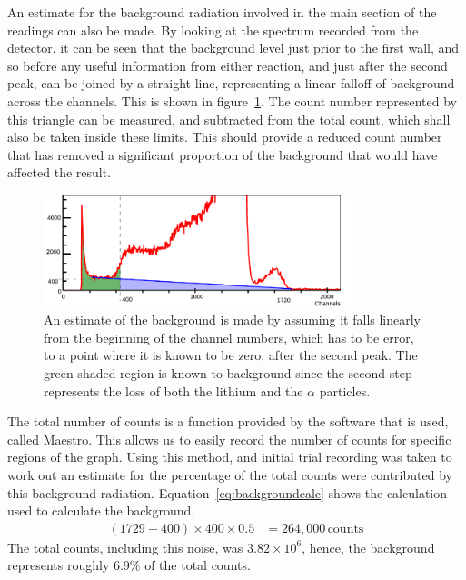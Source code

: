 An estimate for the background radiation involved in the main section of the readings can also be made. By looking at the spectrum recorded from the detector, it can be seen that the background level just prior to the first wall, and so before any useful information from either reaction, and just after the second peak, can be joined by a straight line, representing a linear falloff of background across the channels. This is shown in figure~\ref{fig:bf3errorest}. The count number represented by this triangle can be measured, and subtracted from the total count, which shall also be taken inside these limits. This should provide a reduced count number that has removed a significant proportion of the background that would have affected the result.
\begin{figure}[ht]
  \centering
  \includegraphics[width=0.8\textwidth]{BF3background.pdf}
  \caption{An estimate of the background is made by assuming it falls linearly from the beginning of the channel numbers, which has to be error, to a point where it is known to be zero, after the second peak. The green shaded region is known to background since the second step represents the loss of both the lithium and the $\alpha$ particles. \label{fig:bf3errorest}}
\end{figure}

The total number of counts is a function provided by the software that is used, called Maestro. This allows us to easily record the number of counts for specific regions of the graph. Using this method, and initial trial recording was taken to work out an estimate for the percentage of the total counts were contributed by this background radiation. Equation~\ref{eq:backgroundcalc} shows the calculation used to calculate the background,
\begin{align}
  (1729-400)\times 400 \times 0.5 &= 264,000\,\text{counts} \label{eq:backgroundcalc}
\end{align}
The total counts, including this noise, was $3.82\times10^6$, hence, the background represents roughly 6.9\% of the total counts.

